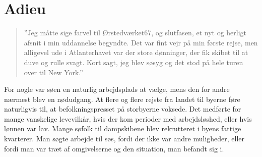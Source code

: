 \chapter{Adieu}\label{adieu}

\begin{quote}
    ''Jeg måtte sige farvel til Ørstedværket67, og slutfasen, et nyt og
herligt afsnit i min uddannelse begyndte. Det var fint vejr på min
første rejse, men alligevel ude i Atlanterhavet var der store dønninger,
der fik skibet til at duve og rulle svagt. Kort sagt, jeg blev søsyg og
det stod på hele turen over til New York.''
\end{quote}

For nogle var søen en naturlig arbejdsplads at vælge, mens den for andre
nærmest blev en nødudgang. At flere og flere rejste fra landet til byerne
føre naturligvis til, at befolkningspresset på storbyerne voksede. Det
medførte for mange vanskelige levevilkår, hvis der kom perioder med
arbejdsløshed, eller hvis lønnen var lav. Mange søfolk til dampskibene
blev rekrutteret i byens fattige kvarterer. Man søgte arbejde til søs,
fordi der ikke var andre muligheder, eller fordi man var træt af
omgivelserne og den situation, man befandt sig i. 

